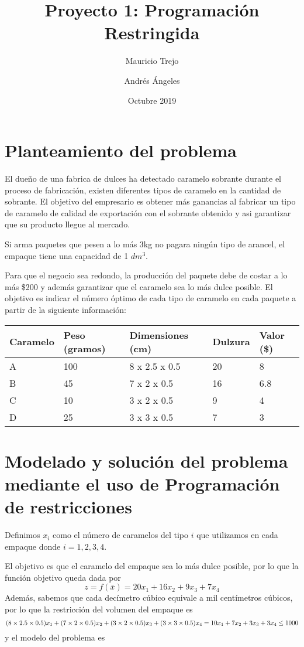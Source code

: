 \documentclass[11pt]{article}
\title{Proyecto 1: Programación Restringida}
\author{Mauricio Trejo \and Andrés Ángeles}
\date{Octubre 2019}
\begin{document}
    
    \maketitle  
    
    \hypertarget{planteamiento-del-problema}{%
\section{Planteamiento del problema}\label{planteamiento-del-problema}}

    El dueño de una fabrica de dulces ha detectado caramelo sobrante durante
el proceso de fabricación, existen diferentes tipos de caramelo en la
cantidad de sobrante. El objetivo del empresario es obtener más
ganancias al fabricar un tipo de caramelo de calidad de exportación con
el sobrante obtenido y asi garantizar que su producto llegue al mercado.

Si arma paquetes que pesen a lo más 3kg no pagara ningún tipo de
arancel, el empaque tiene una capacidad de 1 \(dm^3\).

Para que el negocio sea redondo, la producción del paquete debe de
costar a lo más \$200 y además garantizar que el caramelo sea lo más
dulce posible. El objetivo es indicar el número óptimo de cada tipo de
caramelo en cada paquete a partir de la siguiente información:

    \begin{longtable}[]{@{}lllll@{}}
\toprule
Caramelo & Peso (gramos) & Dimensiones (cm) & Dulzura & Valor
(\$)\tabularnewline
\midrule
\endhead
A & 100 & 8 x 2.5 x 0.5 & 20 & 8\tabularnewline
B & 45 & 7 x 2 x 0.5 & 16 & 6.8\tabularnewline
C & 10 & 3 x 2 x 0.5 & 9 & 4\tabularnewline
D & 25 & 3 x 3 x 0.5 & 7 & 3\tabularnewline
\bottomrule
\end{longtable}

    \hypertarget{modelado-y-soluciuxf3n-del-problema-mediante-el-uso-de-programaciuxf3n-de-restricciones}{%
\section{Modelado y solución del problema mediante el uso de
Programación de
restricciones}\label{modelado-y-soluciuxf3n-del-problema-mediante-el-uso-de-programaciuxf3n-de-restricciones}}

    Definimos \(x_i\) como el número de caramelos del tipo \(i\) que
utilizamos en cada empaque donde \(i = 1, 2, 3, 4\).

El objetivo es que el caramelo del empaque sea lo más dulce posible, por
lo que la función objetivo queda dada por
\begin{equation}
    z = f(\bar{x}) = 20 x_1 + 16 x_2 + 9 x_3 + 7 x_4
\end{equation}
Además, sabemos que cada decímetro cúbico equivale a mil centímetros
cúbicos, por lo que la restricción del volumen del empaque es
\begin{equation}
    (8 \times 2.5 \times 0.5) x_1 + (7 \times 2 \times 0.5) x_2 + (3 \times 2 \times 0.5) x_3 + (3 \times 3 \times 0.5) x_4 =\\10 x_1 + 7 x_2 + 3 x_3 + 3 x_4 \leq 1000
\end{equation}
y el modelo del problema es
\end{document}
